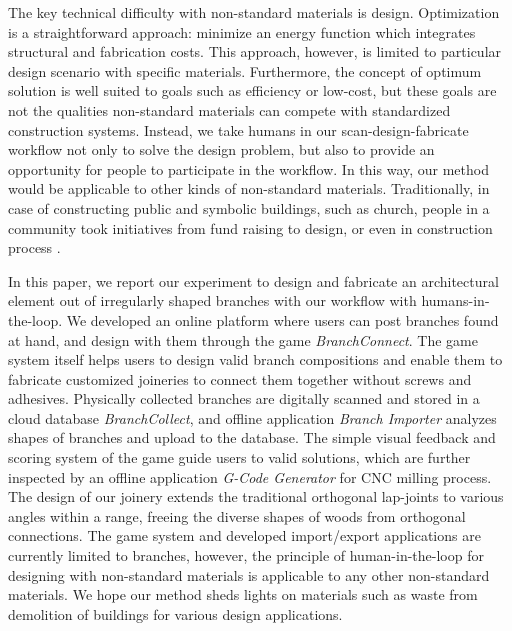 The key technical difficulty with non-standard materials is design.
Optimization is a straightforward approach: minimize an energy function which integrates structural and fabrication costs.
This approach, however, is limited to particular design scenario with specific materials.
Furthermore, the concept of optimum solution is well suited to goals such as efficiency or low-cost, but these goals are not the qualities non-standard materials can compete with standardized construction systems.
Instead, we take humans in our scan-design-fabricate workflow not only to solve the design problem, but also to provide an opportunity for people to participate in the workflow.
In this way, our method would be applicable to other kinds of non-standard materials.
Traditionally, in case of constructing public and symbolic buildings, such as church, people in a community took initiatives from fund raising to design, or even in construction process \cite{}. 



In this paper, we report our experiment to design and fabricate an architectural element out of irregularly shaped branches with our workflow with humans-in-the-loop.
We developed an online platform where users can post branches found at hand, and design with them through the game \textit{BranchConnect}.
The game system itself helps users to design valid branch compositions and enable them to fabricate customized joineries to connect them together without screws and adhesives.
Physically collected branches are digitally scanned and stored in a cloud database \textit{BranchCollect}, and offline application \textit{Branch Importer} analyzes shapes of branches and upload to the database.
The simple visual feedback and scoring system of the game guide users to valid solutions, which are further inspected by an offline application \textit{G-Code Generator} for CNC milling process.
The design of our joinery extends the traditional orthogonal lap-joints to various angles within a range, freeing the diverse shapes of woods from orthogonal connections.
The game system and developed import/export applications are currently limited to branches, however, the principle of human-in-the-loop for designing with non-standard materials is applicable to any other non-standard materials.
We hope our method sheds lights on materials such as waste from demolition of buildings for various design applications.

